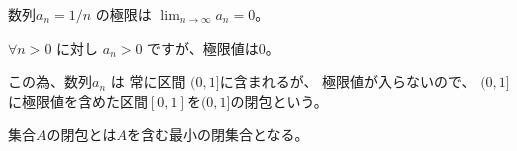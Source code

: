 \documentclass[12pt,b5paper]{ltjsarticle}
\begin{document}
\Large

数列$a_n = 1/n$ の極限は $\displaystyle \lim_{n\rightarrow \infty}a_n = 0$。

$\forall n >0$ に対し $a_n >0$ ですが、極限値は$0$。

この為、数列$a_n$ は 常に区間 $(0,1]$に含まれるが、
極限値が入らないので、
$(0,1]$に極限値を含めた区間$[0,1]$を$(0,1]$の閉包という。

\hrulefill

集合$A$の閉包とは$A$を含む最小の閉集合となる。
\end{document}
